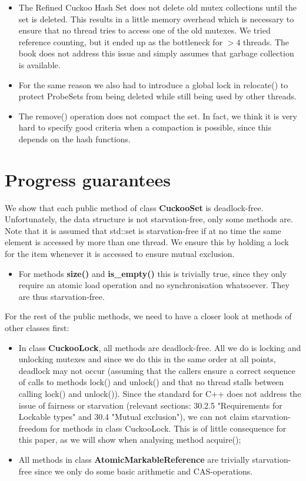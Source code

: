 \documentclass[a4paper,10pt]{article}
\begin{document}
\begin{itemize}
\item The Refined Cuckoo Hash Set does not delete old mutex collections until the set is deleted. This results in a little memory overhead which is necessary to ensure that no thread tries to access one of the old mutexes. We tried reference counting, but it ended up as the bottleneck for $>4$ threads. The book does not address this issue and simply assumes that garbage collection is available.
\item For the same reason we also had to introduce a global lock in relocate() to protect ProbeSets from being deleted while still being used by other threads.
\item The remove() operation does not compact the set. In fact, we think it is very hard to specify good criteria when a compaction is possible, since this depends on the hash functions.

\end{itemize}

\section{Progress guarantees}
\label{sec:progressGuarantees}
We show that each public method of class \textbf{CuckooSet} is deadlock-free. Unfortunately, the data structure is not starvation-free, only some methods are. Note that it is assumed that std::set is starvation-free if at no time the same element is accessed by more than one thread. We ensure this by holding a lock for the item whenever it is accessed to ensure mutual exclusion.
\begin{itemize}
\item For methods \textbf{size()} and \textbf{is\_empty()} this is trivially true, since they only require an atomic load operation and no synchronisation 
whatsoever. They are thus starvation-free.
\end{itemize}
For the rest of the public methods, we need to have a closer look at methods of other classes first:
\begin{itemize}
\item In class \textbf{CuckooLock}, all methods are deadlock-free. All we do is locking and unlocking mutexes and since we do this in the same order at all points, deadlock may not occur (assuming that the callers ensure a correct sequence of calls to methods lock() and unlock() and that no thread stalls between calling lock() and unlock()). 
\newline
Since the standard for C++ \cite{cppstandard} does not address the issue of fairness or starvation (relevant sections: 30.2.5 "Requirements for Lockable types" and 30.4 "Mutual exclusion"), we can not claim starvation-freedom for methods in class CuckooLock. This is of little consequence for this paper, as we will show when analysing method acquire();
\item All methods in class \textbf{AtomicMarkableReference} are trivially starvation-free since we only do some basic arithmetic and CAS-operations.
\end{itemize}
\end{document}
